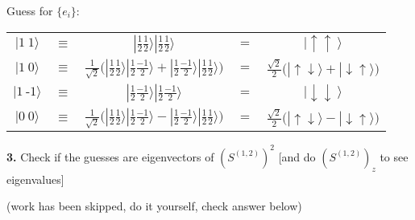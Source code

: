 \documentclass[12pt]{article}
\begin{document}
\begin{minipage}{.45\textwidth}
    Guess for \(\{e_i\}\): \\[15pt]
    { \setlength{\tabcolsep}{3pt}
    \begin{tabular}{c c c c c}
        \( | 1 \ 1 \rangle \)
            & \(\equiv\)
            & \( | \tfrac{1}{2} \tfrac{1}{2} \rangle | \tfrac{1}{2} \tfrac{1}{2} \rangle \)
            & \(=\) 
            &\( | \uparrow \uparrow \ \rangle \) \\[10pt]
        \( | 1 \ 0 \rangle \) 
            & \(\equiv\)
            & \( \tfrac{1}{\sqrt{2}} \Big(
                | \tfrac{1}{2} \tfrac{1}{2} \rangle | \tfrac{1}{2} \tfrac{-1}{2} \rangle +
                | \tfrac{1}{2} \tfrac{-1}{2} \rangle | \tfrac{1}{2} \tfrac{1}{2} \rangle \Big) \)
            & \(=\)
            & \( \tfrac{\sqrt{2}}{2} \big( | {\scriptstyle \uparrow \downarrow} \rangle +
                | {\scriptstyle \downarrow \uparrow} \rangle \big) \) \\[10pt]
        \( | 1 \ \text{-}1 \rangle \)
            & \(\equiv\)
            & \( | \tfrac{1}{2} \tfrac{-1}{2} \rangle | \tfrac{1}{2} \tfrac{-1}{2} \rangle \)
            & \(=\)
            & \( | \downarrow \downarrow \ \rangle \) \\[20pt]
        \( | 0 \ 0 \rangle \)
            & \( \equiv \)
            & \( \tfrac{1}{\sqrt{2}} \Big( 
                | \tfrac{1}{2} \tfrac{1}{2} \rangle | \tfrac{1}{2} \tfrac{-1}{2} \rangle -
                | \tfrac{1}{2} \tfrac{-1}{2} \rangle | \tfrac{1}{2} \tfrac{1}{2} \rangle \Big) \)
            & \(=\)
            & \( \tfrac{\sqrt{2}}{2} \big( | {\scriptstyle \uparrow \downarrow} \rangle - 
                | {\scriptstyle \downarrow \uparrow} \rangle \big) \)
    \end{tabular} }
\end{minipage}

\vspace{25pt} \noindent
\textbf{3.} Check if the guesses are eigenvectors of \(\left( S^{(1,2)} \right)^2\) 
    [and do \(\left( S^{(1,2)} \right)_z\) to see eigenvalues]

{\scriptsize (work has been skipped, do it yourself, check answer below)}
\end{document}
